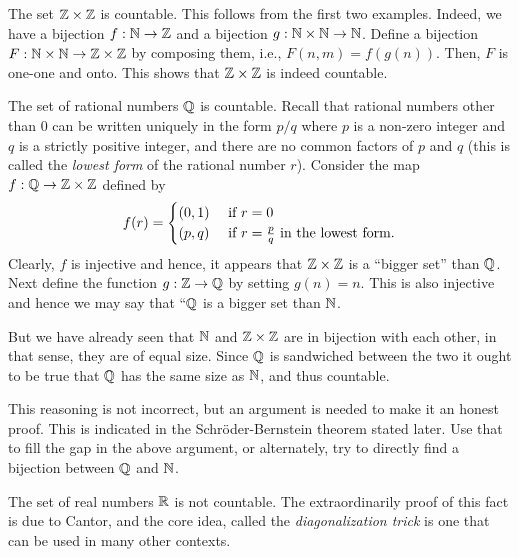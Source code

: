 \documentclass[preprint,  11pt]{amsart}
\begin{document}
\beg The set $\mathbb{Z}\times \mathbb{Z}$ is countable. This follows from the first two examples. Indeed, we have a bijection $f:\mathbb{N}\rightarrow \mathbb{Z}$ and a bijection $g:\mathbb{N}\times \mathbb{N} \rightarrow \mathbb{N}$. Define a bijection $F:\mathbb{N}\times \mathbb{N}\rightarrow \mathbb{Z}\times \mathbb{Z}$ by composing them, i.e., $F(n,m)=f(g(n))$. Then, $F$ is one-one and onto. This shows that $\mathbb{Z}\times \mathbb{Z}$ is indeed countable.
\eeg

\beg The set of rational numbers $\mathbb{Q}$ is countable. Recall that rational numbers other than $0$ can be written uniquely in the form $p/q$ where $p$ is a non-zero integer and $q$ is a strictly positive integer, and there are no common factors of $p$ and $q$ (this is called the {\em lowest form} of the rational number $r$). Consider the map $f:\mathbb{Q}\rightarrow \mathbb{Z}\times \mathbb{Z}$ defined by
$$
f(r) = \begin{cases} (0,1) & \mbox{ if }r=0 \\ (p,q) & \mbox{ if }r=\frac{p}{q} \mbox{ in the lowest form}. \end{cases}
$$
Clearly, $f$ is injective and hence, it appears that $\mathbb{Z}\times \mathbb{Z}$ is a ``bigger set'' than $\mathbb{Q}$. Next define the function $g:\mathbb{Z}\rightarrow \mathbb{Q}$ by setting $g(n)=n$. This is also injective and hence we may say that ``$\mathbb{Q}$ is a bigger set than $\mathbb{N}$.

But we  have already seen that $\mathbb{N}$ and $\mathbb{Z}\times \mathbb{Z}$ are in bijection with each other, in that sense, they are of equal size. Since $\mathbb{Q}$ is sandwiched between the two it ought to be true that $\mathbb{Q}$ has the same size as $\mathbb{N}$, and thus countable.

This reasoning is not incorrect, but an argument is needed to make it an honest proof. This is indicated in the Schr\"{o}der-Bernstein theorem stated later. Use that to fill the gap in the above argument, or alternately, try to directly find a bijection between $\mathbb{Q}$ and $\mathbb{N}$.
\eeg



\beg The set of real numbers $\mathbb{R}$ is not countable. The extraordinarily proof of this fact is due to Cantor, and the core idea, called the {\em diagonalization trick} is one that can be used in many other contexts.
\end{document}
